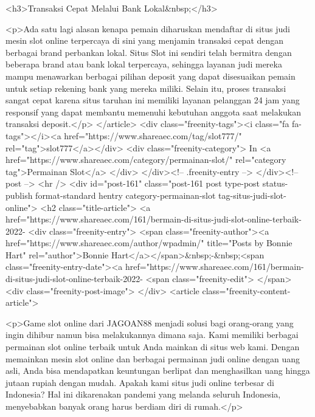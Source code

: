 {<h3>Transaksi Cepat Melalui Bank Lokal&nbsp;</h3>



<p>Ada satu lagi alasan kenapa pemain diharuskan mendaftar di situs judi mesin slot online terpercaya di sini yang menjamin transaksi cepat dengan berbagai brand perbankan lokal. Situs Slot ini sendiri telah bermitra dengan beberapa brand atau bank lokal terpercaya, sehingga layanan judi mereka mampu menawarkan berbagai pilihan deposit yang dapat disesuaikan pemain untuk setiap rekening bank yang mereka miliki. Selain itu, proses transaksi sangat cepat karena situs taruhan ini memiliki layanan pelanggan 24 jam yang responsif yang dapat membantu memenuhi kebutuhan anggota saat melakukan transaksi deposit.</p>
									</article>
																			<div class="freenity-tags"><i class="fa fa-tags"></i><a href="https://www.shareaec.com/tag/slot777/" rel="tag">slot777</a></div>
																			<div class="freenity-category">
											In <a href="https://www.shareaec.com/category/permainan-slot/" rel="category tag">Permainan Slot</a>										</div>
																	</div><!-- .freenity-entry -->
							</div><!-- post -->
							<hr />
													<div id="post-161" class="post-161 post type-post status-publish format-standard hentry category-permainan-slot tag-situs-judi-slot-online">
								<h2 class="title-article">
									<a href="https://www.shareaec.com/161/bermain-di-situs-judi-slot-online-terbaik-2022-%
								<div class="freenity-entry">
									<span class="freenity-author"><a href="https://www.shareaec.com/author/wpadmin/" title="Posts by Bonnie Hart" rel="author">Bonnie Hart</a></span>&nbsp;-&nbsp;<span class="freenity-entry-date"><a href="https://www.shareaec.com/161/bermain-di-situs-judi-slot-online-terbaik-2022-%
									<span class="freenity-edit"> </span>
									<div class="freenity-post-image">  </div>
																		<article class="freenity-content-article">
										
<p>Game slot online dari JAGOAN88 menjadi solusi bagi orang-orang yang ingin dihibur namun bisa melakukannya dimana saja. Kami memiliki berbagai permainan slot online terbaik untuk Anda mainkan di situs web kami. Dengan memainkan mesin slot online dan berbagai permainan judi online dengan uang asli, Anda bisa mendapatkan keuntungan berlipat dan menghasilkan uang hingga jutaan rupiah dengan mudah. Apakah kami situs judi online terbesar di Indonesia? Hal ini dikarenakan pandemi yang melanda seluruh Indonesia, menyebabkan banyak orang harus berdiam diri di rumah.</p>



}
